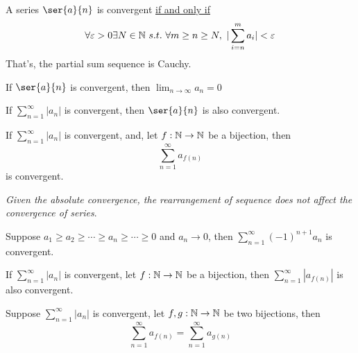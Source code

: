 \documentclass[11pt]{article}
\begin{document}
        \begin{theorem}
            A series $\ser{a}{n}$ is convergent \ul{if and only if}
            \begin{equation}
                \forall \varepsilon > 0 \exists N \in \mathbb{N}\ s.t.\ \forall m \geq n \geq N,\ |\sum_{i=n}^m a_i| < \varepsilon
            \end{equation}
            That's, the partial sum sequence is Cauchy.
        \end{theorem}
        
        \begin{corollary}
            If $\ser{a}{n}$ is convergent, then $\lim_{n \to \infty} a_n = 0$
        \end{corollary}
        
        \begin{corollary}
            If $\sum_{n=1}^\infty |a_n|$ is convergent, then $\ser{a}{n}$ is also convergent.
        \end{corollary}
        
        \begin{corollary}
            If $\sum_{n=1}^\infty |a_n|$ is convergent, and, let $f: \mathbb{N} \to \mathbb{N}$ be a bijection, then 
            \begin{equation}
                \sum_{n=1}^\infty a_{f(n)}
            \end{equation}
            is convergent.
        \end{corollary}
        \emph{Given the absolute convergence, the rearrangement of sequence does not affect the convergence of series}.
        
        \begin{theorem}
            Suppose $a_1 \geq a_2 \geq \cdots \geq a_n \geq \cdots \geq 0$ and $a_n \to 0$, then $\sum_{n=1}^\infty (-1)^{n+1}a_n$ is convergent.
        \end{theorem}
        
        \begin{theorem}
            If $\sum_{n=1}^\infty |a_n|$ is convergent, let $f: \mathbb{N} \to \mathbb{N}$ be a bijection, then $\sum_{n=1}^\infty |a_{f(n)}|$ is also convergent.
        \end{theorem}
        
        \begin{theorem}
            Suppose $\sum_{n=1}^\infty |a_n|$ is convergent, let $f, g: \mathbb{N} \to \mathbb{N}$ be two bijections, then
            \begin{equation}
                \sum_{n=1}^\infty a_{f(n)} = \sum_{n=1}^\infty a_{g(n)}
            \end{equation}
        \end{theorem}
        
\end{document}

